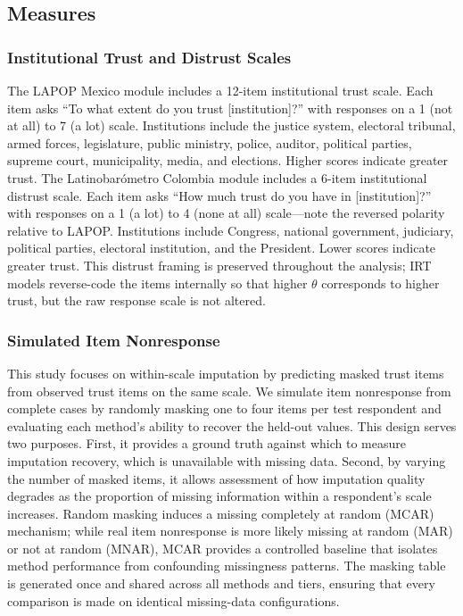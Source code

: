 \documentclass[
  man,
  floatsintext,
  longtable,
  nolmodern,
  notxfonts,
  notimes,
  colorlinks=true,linkcolor=blue,citecolor=blue,urlcolor=blue]{apa7}
\begin{document}
\subsection{Measures}\label{measures}

\subsubsection{Institutional Trust and Distrust
Scales}\label{institutional-trust-and-distrust-scales}

The LAPOP Mexico module includes a 12-item institutional trust scale.
Each item asks ``To what extent do you trust {[}institution{]}?'' with
responses on a 1 (not at all) to 7 (a lot) scale. Institutions include
the justice system, electoral tribunal, armed forces, legislature,
public ministry, police, auditor, political parties, supreme court,
municipality, media, and elections. Higher scores indicate greater
trust. The Latinobarómetro Colombia module includes a 6-item
institutional distrust scale. Each item asks ``How much trust do you
have in {[}institution{]}?'' with responses on a 1 (a lot) to 4 (none at
all) scale---note the reversed polarity relative to LAPOP. Institutions
include Congress, national government, judiciary, political parties,
electoral institution, and the President. Lower scores indicate greater
trust. This distrust framing is preserved throughout the analysis; IRT
models reverse-code the items internally so that higher \(\theta\)
corresponds to higher trust, but the raw response scale is not altered.

\subsubsection{Simulated Item
Nonresponse}\label{simulated-item-nonresponse}

This study focuses on within-scale imputation by predicting masked trust
items from observed trust items on the same scale. We simulate item
nonresponse from complete cases by randomly masking one to four items
per test respondent and evaluating each method's ability to recover the
held-out values. This design serves two purposes. First, it provides a
ground truth against which to measure imputation recovery, which is
unavailable with missing data. Second, by varying the number of masked
items, it allows assessment of how imputation quality degrades as the
proportion of missing information within a respondent's scale increases.
Random masking induces a missing completely at random (MCAR) mechanism;
while real item nonresponse is more likely missing at random (MAR) or
not at random (MNAR), MCAR provides a controlled baseline that isolates
method performance from confounding missingness patterns. The masking
table is generated once and shared across all methods and tiers,
ensuring that every comparison is made on identical missing-data
configurations.
\end{document}
